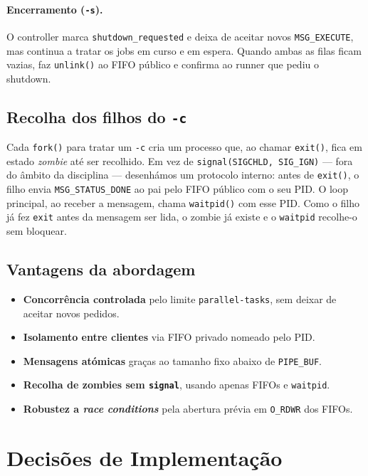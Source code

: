 \documentclass[runningheads,11pt]{llncs}
\begin{document}
        \paragraph{Encerramento (\texttt{-s}).} O controller marca \texttt{shutdown\_requested} e deixa de aceitar novos \texttt{MSG\_EXECUTE}, mas continua a tratar os jobs em curso e em espera. Quando ambas as filas ficam vazias, faz \texttt{unlink()} ao FIFO público e confirma ao runner que pediu o shutdown.

        \subsection{Recolha dos filhos do \texttt{-c}}
        \label{sec:filhos-c}

        Cada \texttt{fork()} para tratar um \texttt{-c} cria um processo que, ao chamar \texttt{exit()}, fica em estado \textit{zombie} até ser recolhido. Em vez de \texttt{signal(SIGCHLD, SIG\_IGN)} — fora do âmbito da disciplina — desenhámos um protocolo interno: antes de \texttt{exit()}, o filho envia \texttt{MSG\_STATUS\_DONE} ao pai pelo FIFO público com o seu PID. O loop principal, ao receber a mensagem, chama \texttt{waitpid()} com esse PID. Como o filho já fez \texttt{exit} antes da mensagem ser lida, o zombie já existe e o \texttt{waitpid} recolhe-o sem bloquear.

        \subsection{Vantagens da abordagem}

        \begin{itemize}
        \item \textbf{Concorrência controlada} pelo limite \texttt{parallel-tasks}, sem deixar de aceitar novos pedidos.
        \item \textbf{Isolamento entre clientes} via FIFO privado nomeado pelo PID.
        \item \textbf{Mensagens atómicas} graças ao tamanho fixo abaixo de \texttt{PIPE\_BUF}.
        \item \textbf{Recolha de zombies sem \texttt{signal}}, usando apenas FIFOs e \texttt{waitpid}.
        \item \textbf{Robustez a \textit{race conditions}} pela abertura prévia em \texttt{O\_RDWR} dos FIFOs.
        \end{itemize}

        \section{Decisões de Implementação}
\end{document}
